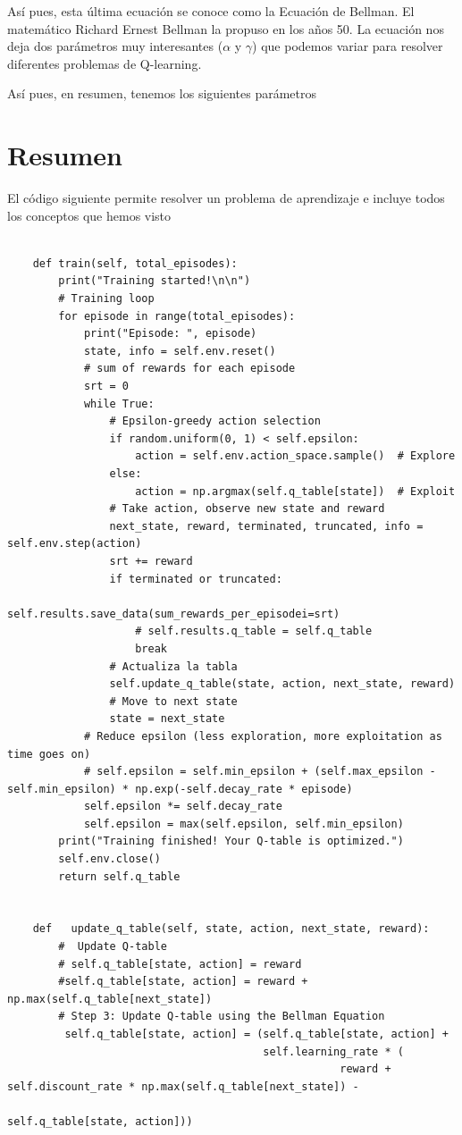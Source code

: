 \documentclass{article}
\begin{document}
\begin{itemize}
Así pues, esta última ecuación se conoce como la Ecuación de Bellman. El matemático Richard Ernest Bellman la propuso en los años 50. La ecuación nos deja dos parámetros muy interesantes ($\alpha$ y $\gamma$) que podemos variar para resolver diferentes problemas de Q-learning.

Así pues, en resumen, tenemos los siguientes parámetros

\section{Resumen}
El código siguiente permite resolver un problema de aprendizaje e incluye todos los conceptos que hemos visto
\begin{verbatim}
    
    def train(self, total_episodes):
        print("Training started!\n\n")
        # Training loop
        for episode in range(total_episodes):
            print("Episode: ", episode)
            state, info = self.env.reset()
            # sum of rewards for each episode
            srt = 0
            while True:
                # Epsilon-greedy action selection
                if random.uniform(0, 1) < self.epsilon:
                    action = self.env.action_space.sample()  # Explore
                else:
                    action = np.argmax(self.q_table[state])  # Exploit
                # Take action, observe new state and reward
                next_state, reward, terminated, truncated, info = self.env.step(action)
                srt += reward
                if terminated or truncated:
                    self.results.save_data(sum_rewards_per_episodei=srt)
                    # self.results.q_table = self.q_table
                    break
                # Actualiza la tabla
                self.update_q_table(state, action, next_state, reward)
                # Move to next state
                state = next_state
            # Reduce epsilon (less exploration, more exploitation as time goes on)
            # self.epsilon = self.min_epsilon + (self.max_epsilon - self.min_epsilon) * np.exp(-self.decay_rate * episode)
            self.epsilon *= self.decay_rate
            self.epsilon = max(self.epsilon, self.min_epsilon)
        print("Training finished! Your Q-table is optimized.")
        self.env.close()
        return self.q_table


    def   update_q_table(self, state, action, next_state, reward):
        #  Update Q-table
        # self.q_table[state, action] = reward
        #self.q_table[state, action] = reward + np.max(self.q_table[next_state])
        # Step 3: Update Q-table using the Bellman Equation
         self.q_table[state, action] = (self.q_table[state, action] +
                                        self.learning_rate * (
                                                    reward + self.discount_rate * np.max(self.q_table[next_state]) -
                                                    self.q_table[state, action]))


\end{verbatim}
\end{itemize}
\end{document}
